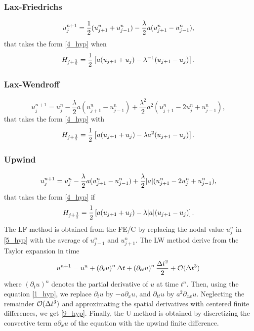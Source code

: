 \subsubsection*{Lax-Friedrichs}
\begin{equation}
    u_j^{n+1} = \frac{1}{2} (u_{j+1}^n + u^n_{j-1}) - \frac{\lambda}{2} a(u^n_{j+1} - u^n_{j-1}),
    \label{7_hyp}
\end{equation}
that takes the form \eqref{4_hyp} when  
\begin{equation}
    H_{j+\frac{1}{2}} = \frac{1}{2} \left[ a(u_{j+1} + u_j) - \lambda^{-1} (u_{j+1} - u_j)\right]. 
    \label{8_hyp}
\end{equation}
\subsubsection*{Lax-Wendroff}
\begin{equation}
    u_j^{n+1} = u^n_j - \frac{\lambda}{2} a(u_{j+1}^n - u^n_{j-1}) + \frac{\lambda^2}{2} a^2(u^n_{j+1} -2u^n_j + u^n_{j-1}),
    \label{9_hyp}
\end{equation}
that takes the form \eqref{4_hyp} with 
\begin{equation}
    H_{j+\frac{1}{2}} = \frac{1}{2} \left[ a(u_{j+1} + u_j) - \lambda a^2 (u_{j+1} - u_j)\right]. 
    \label{10_hyp}
\end{equation}
\subsubsection*{Upwind}
\begin{equation}
    u_j^{n+1} = u^n_j - \frac{\lambda}{2} a(u_{j+1}^n - u^n_{j-1}) + \frac{\lambda}{2} \abs{a}(u^n_{j+1} -2u^n_j + u^n_{j-1}),
    \label{11_hyp}
\end{equation}
that takes the form \eqref{4_hyp} if 
\begin{equation}
    H_{j+\frac{1}{2}} = \frac{1}{2} \left[ a(u_{j+1} + u_j) - \lambda \abs{a}(u_{j+1} - u_j)\right]. 
    \label{12_hyp}
\end{equation}
The LF method is obtained from the FE/C by replacing the nodal value \(u_j^n\) in \eqref{5_hyp} with the average of \(u_{j-1}^n\) and \(u^n_{j+1}\). The LW method derive from the Taylor expansion in time 
\[
    u^{n+1} = u^n + \left( \partial_t u \right)^n \Delta t + \left( \partial_{tt} u \right)^n \frac{\Delta t^2}{2} + \mathcal{O}(\Delta t^3)
\]
where \((\partial_t u)^n\) denotes the partial derivative of \(u\) at time \(t^n\). Then, using the equation \eqref{1_hyp}, we replace \(\partial_t u\) by \(-a\partial_x u\), and \(\partial_{tt}u\) by \(a^2\partial_{xx} u\). Neglecting the remainder \(\mathcal{O}(\Delta t^3)\) and approximating the spatial derivatives with centered finite differences, we get \eqref{9_hyp}. Finally, the U method is obtained by discretizing the convective term \(a\partial_x u\) of the equation with the upwind finite difference.

